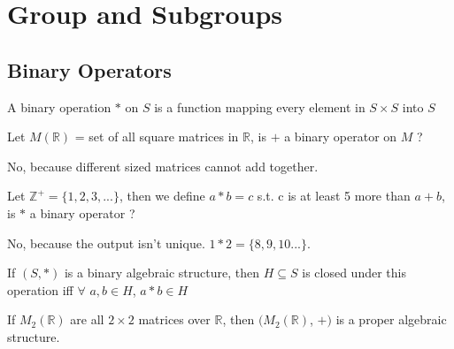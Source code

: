\chapter{Group and Subgroups}
\section{Binary Operators}

\begin{definition}
    A binary operation $*$ on $S$ is a function mapping every element in $S \times S$ into $S$
\end{definition}

\begin{exercise}
    Let $M(\mathbb{R})$ = set of all square matrices in $\mathbb{R}$, is $+$ a binary operator on $M$ ?
\end{exercise}
\begin{answer}
    No, because different sized matrices cannot add together.
\end{answer}

\begin{exercise}
    Let $\mathbb{Z}^+ = \{1, 2, 3, ... \} $, then we define $a*b=c$ s.t. c is at least 5 more than $a+b$, is $*$ a binary operator ?
\end{exercise}
\begin{answer}
    No, because the output isn't unique. $1*2 = \{8, 9, 10...\}$.
\end{answer}

\begin{definition}
    If $(S, *)$ is a binary algebraic structure, then $H\subseteq S$ is closed under this operation iff $\forall$ $a, b \in H$, $a*b \in H$
\end{definition}

\begin{note}
    If $M_{2}(\mathbb{R})$ are all $2\times2$ matrices over $\mathbb{R}$, then $(M_{2}(\mathbb{R})$, $+)$ is a proper algebraic structure.\\ 
\end{note}

